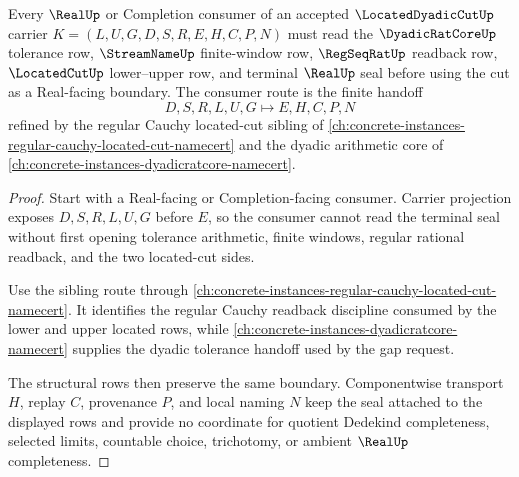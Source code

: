 \begin{theorem}
\label{thm:located-dyadic-cut-real-seal-handoff}
Every $\RealUp$ or Completion consumer of an accepted $\LocatedDyadicCutUp$ carrier $K=(L,U,G,D,S,R,E,H,C,P,N)$ must read the $\DyadicRatCoreUp$ tolerance row, $\StreamNameUp$ finite-window row, $\RegSeqRatUp$ readback row, $\LocatedCutUp$ lower--upper row, and terminal $\RealUp$ seal before using the cut as a Real-facing boundary. The consumer route is the finite handoff
$$
D,S,R,L,U,G \longmapsto E,H,C,P,N
$$
refined by the regular Cauchy located-cut sibling of \autoref{ch:concrete-instances-regular-cauchy-located-cut-namecert} and the dyadic arithmetic core of \autoref{ch:concrete-instances-dyadicratcore-namecert}.
\end{theorem}
\begin{proof}
Start with a Real-facing or Completion-facing consumer. Carrier projection exposes $D,S,R,L,U,G$ before $E$, so the consumer cannot read the terminal seal without first opening tolerance arithmetic, finite windows, regular rational readback, and the two located-cut sides.

Use the sibling route through \autoref{ch:concrete-instances-regular-cauchy-located-cut-namecert}. It identifies the regular Cauchy readback discipline consumed by the lower and upper located rows, while \autoref{ch:concrete-instances-dyadicratcore-namecert} supplies the dyadic tolerance handoff used by the gap request.

The structural rows then preserve the same boundary. Componentwise transport $H$, replay $C$, provenance $P$, and local naming $N$ keep the seal attached to the displayed rows and provide no coordinate for quotient Dedekind completeness, selected limits, countable choice, trichotomy, or ambient $\RealUp$ completeness.
\end{proof}



